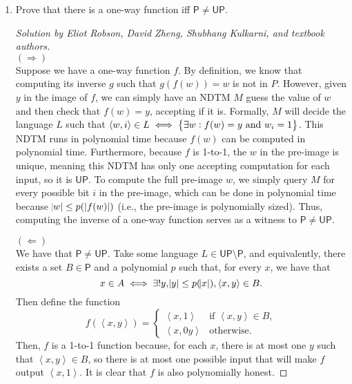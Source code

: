 \documentclass{article}
\newenvironment{solution}[1]{\begin{proof}[Solution by #1]}{\end{proof}}
\newcommand{\inp}[1]{\left\langle #1 \right\rangle} %
\newcommand{\Pe}{\mathsf{P}}
\newcommand{\UP}{\mathsf{UP}}
\begin{document}
\begin{enumerate}
    \item Prove that there is a one-way function iff \(\Pe \neq \UP\).
    
    \begin{solution}{Eliot Robson, David Zheng, Shubhang Kulkarni, and textbook authors}
        \hfill\\
        \((\Longrightarrow)\)\\
        Suppose we have a one-way function \(f\). By definition, we know that computing its inverse \(g\) such that \(g(f(w)) = w\) is not in \(P\). However, given \(y\) in the image of \(f\), we can simply have an NDTM \(M\) guess the value of \(w\) and then check that \(f(w) = y\), accepting if it is. Formally, \(M\) will decide the language \(L\) such that \(\inp{w, i} \in L \iff \set{\exists w : f(w) = y \text{ and } w_i = 1}\). This NDTM runs in polynomial time because \(f(w)\) can be computed in polynomial time. Furthermore, because \(f\) is 1-to-1, the \(w\) in the pre-image is unique, meaning this NDTM has only one accepting computation for each input, so it is \(\UP\). To compute the full pre-image \(w\), we simply query \(M\) for every possible bit \(i\) in the pre-image, which can be done in polynomial time because \(\abs{w} \leq p(\abs[0]{f(w)})\) (i.e., the pre-image is polynomially sized). Thus, computing the inverse of a one-way function serves as a witness to \(\Pe \neq \UP\).
        
        \((\Longleftarrow)\)\\
        We have that \(\Pe \neq \UP\). Take some language \(L \in \UP \setminus \Pe\), and equivalently, there exists a set \(B \in \Pe\) and a polynomial \(p\) such that, for every \(x\), we have that
        \[
            x \in A
            \iff%
            \exists! y, \abs{y} \leq p(\abs{x}), \inp{x,y} \in B.
        \]
        Then define the function
        \[
            f(\inp{x,y})
            =%
            \begin{cases}
                \inp{x,1} &\text{if } \inp{x,y} \in B,\\
                \inp{x, 0y} &\text{otherwise}.
            \end{cases}
        \]
        Then, \(f\) is a 1-to-1 function because, for each \(x\), there is at most one \(y\) such that \(\inp{x,y} \in B\), so there is at most one possible input that will make \(f\) output \(\inp{x,1}\). It is clear that \(f\) is also polynomially honest.
        

\end{solution}
\end{enumerate}
\end{document}
